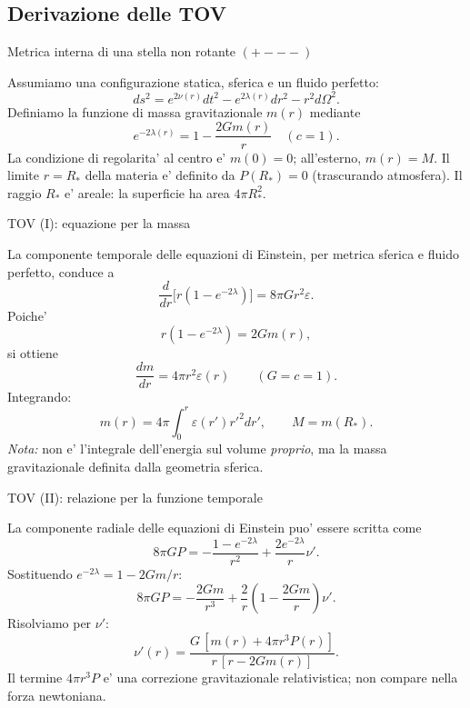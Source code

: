 \subsection{Derivazione delle TOV}

\begin{frame}[t]{Metrica interna di una stella non rotante $(+---)$}\small\raggedright

Assumiamo una configurazione statica, sferica e un fluido perfetto:
\[
ds^2=e^{2\nu(r)}dt^2-e^{2\lambda(r)}dr^2-r^2d\Omega^2.
\]
Definiamo la funzione di massa gravitazionale $m(r)$ mediante
\[
\boxed{e^{-2\lambda(r)}=1-\frac{2Gm(r)}{r}}
\quad(c=1).
\]
La condizione di regolarita' al centro e' $m(0)=0$; all'esterno, $m(r)=M$.
\medskip
Il limite $r=R_*$ della materia e' definito da $P(R_*)=0$ (trascurando atmosfera). Il raggio $R_*$ e' areale: la superficie ha area $4\pi R_*^2$.

\end{frame}

\begin{frame}[t]{TOV (I): equazione per la massa}\small\raggedright

La componente temporale delle equazioni di Einstein, per metrica sferica e fluido perfetto, conduce a
\[
\frac{d}{dr}\big[r(1-e^{-2\lambda})\big]=8\pi G r^2\varepsilon.
\]
Poiche'
\[
r(1-e^{-2\lambda})=2Gm(r),
\]
si ottiene
\[
\boxed{\frac{dm}{dr}=4\pi r^2\varepsilon(r)}\qquad(G=c=1).
\]
Integrando:
\[
m(r)=4\pi\int_0^r\varepsilon(r')r'^2dr',\qquad
M=m(R_*).
\]
\textit{Nota:} non e' l'integrale dell'energia sul volume \emph{proprio}, ma la massa gravitazionale definita dalla geometria sferica.

\end{frame}

\begin{frame}[t]{TOV (II): relazione per la funzione temporale}\small\raggedright

La componente radiale delle equazioni di Einstein puo' essere scritta come
\[
8\pi G P=-\frac{1-e^{-2\lambda}}{r^2}
+\frac{2e^{-2\lambda}}{r}\nu'.
\]
Sostituendo $e^{-2\lambda}=1-2Gm/r$:
\[
8\pi GP=-\frac{2Gm}{r^3}
+\frac2r\left(1-\frac{2Gm}{r}\right)\nu'.
\]
Risolviamo per $\nu'$:
\[
\boxed{\nu'(r)=\frac{G\,[m(r)+4\pi r^3P(r)]}
{r\,[r-2Gm(r)]}.}
\]
Il termine $4\pi r^3P$ e' una correzione gravitazionale relativistica; non compare nella forza newtoniana.

\end{frame}

